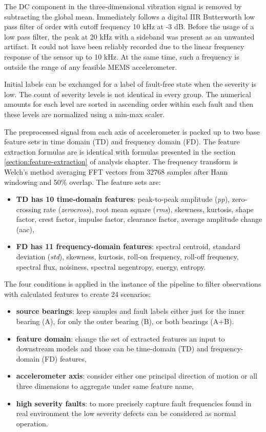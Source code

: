 The DC component in the three-dimensional vibration signal is removed by subtracting the global mean. Immediately follows a digital IIR Butterworth low pass filter of  order with cutoff frequency 10 kHz at -3 dB. Before the usage of a low pass filter, the peak at 20 kHz with a sideband was present as an unwanted artifact. It could not have been reliably recorded due to the linear frequency response of the sensor up to 10 kHz. At the same time, such a frequency is outside the range of any feasible MEMS accelerometer.

Initial labels can be exchanged for a label of fault-free state when the severity is low. The count of severity levels is not identical in every group. The numerical amounts for each level are sorted in ascending order within each fault and then these levels are normalized using a min-max scaler.

The preprocessed signal from each axis of accelerometer is packed up to two base feature sets in time domain (TD) and frequency domain (FD). The feature extraction formulas are is identical with formulas presented in the section \ref{section:feature-extraction} of analysis chapter. The frequency transform is Welch's method averaging FFT vectors from 32768 samples after Hann windowing and 50\% overlap. The feature sets are:
\begin{itemize}
\item \textbf{TD has 10 time-domain features}: peak-to-peak amplitude (\emph{pp}), zero-crossing rate (\emph{zerocross}), root mean square (\emph{rms}), skewness, kurtosis, shape factor, crest factor, impulse factor, clearance factor, average amplitude change (aac), 
\item \textbf{FD has 11 frequency-domain features}: spectral centroid, standard deviation (\emph{std}), skewness, kurtosis, roll-on frequency, roll-off frequency, spectral flux, noisiness, spectral negentropy, energy, entropy.
\end{itemize}
 
The four conditions is applied in the instance of the pipeline to filter observations with calculated features to create 24 scenarios:
\begin{itemize}
\item \textbf{source bearings}: keep samples and fault labels either just for the inner bearing (A), for only the outer bearing (B), or both bearings (A+B).
\item \textbf{feature domain}: change the set of extracted features an input to downstream models and those can be time-domain (TD) and frequency-domain (FD) features,
\item \textbf{accelerometer axis}: consider either one principal direction of motion or all three dimensions to aggregate under same feature name,
\item \textbf{high severity faults}: to more precisely capture fault frequencies found in real environment the low severity defects can be considered as normal operation.
\end{itemize}

